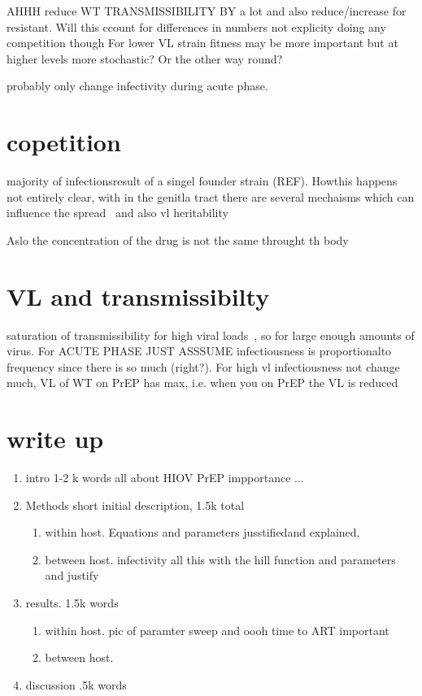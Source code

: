 \documentclass[DIV=15]{scrartcl}
\begin{document}
AHHH
reduce WT TRANSMISSIBILITY BY  a lot  and also reduce/increase for resistant. Will this ccount for differences in numbers not explicity doing any competition though
For  lower VL strain fitness may be more important but at higher levels more stochastic? Or the other way round?
 
 probably only change infectivity during acute phase.
 


\section{copetition}
 majority of infectionsresult of a singel founder strain (REF). Howthis happens not entirely clear, with in the genitla tract there are several mechaisms which can influence the spread~\cite{joseph2015} and also vl heritability~\cite{fraser2014}
 
 Aslo the concentration of the drug is not the same throught th body~\cite{patterson2011}
 
 
 \section*{VL and transmissibilty}
 
saturation of transmissibility for high viral loads~\cite{fraser2007}, so for large enough amounts of virus. For  ACUTE PHASE JUST ASSSUME  	infectiousness  is  proportionalto frequency since there is  so much (right?). For  high vl infectiousness not change much, VL of WT on PrEP has max, i.e. when you on PrEP the VL is reduced 
 
 
 
 \section*{write up}
 
\begin{enumerate}
\item intro 1-2 k words all about HIOV PrEP impportance ...
\item Methods short initial description, 1.5k total
\begin{enumerate}
\item within host. Equations and parameters jusstifiedand explained,

\item between host. infectivity all  this with the hill function and parameters and justify 



\end{enumerate}

\item results. 1.5k words
\begin{enumerate}
\item within host.  pic of paramter sweep and oooh time  to ART important 


\item between host. 

\end{enumerate}
\item discussion .5k words
\end{enumerate} 
 
\end{document}
